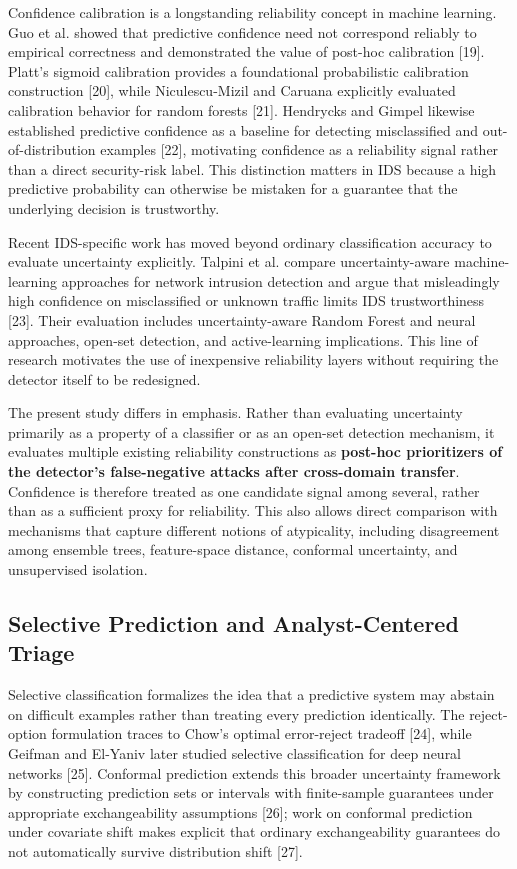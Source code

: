 \documentclass[conference]{IEEEtran}
\begin{document}
Confidence calibration is a longstanding reliability concept in machine learning. Guo et al. showed that predictive confidence need not correspond reliably to empirical correctness and demonstrated the value of post-hoc calibration [19]. Platt's sigmoid calibration provides a foundational probabilistic calibration construction [20], while Niculescu-Mizil and Caruana explicitly evaluated calibration behavior for random forests [21]. Hendrycks and Gimpel likewise established predictive confidence as a baseline for detecting misclassified and out-of-distribution examples [22], motivating confidence as a reliability signal rather than a direct security-risk label. This distinction matters in IDS because a high predictive probability can otherwise be mistaken for a guarantee that the underlying decision is trustworthy.

Recent IDS-specific work has moved beyond ordinary classification accuracy to evaluate uncertainty explicitly. Talpini et al. compare uncertainty-aware machine-learning approaches for network intrusion detection and argue that misleadingly high confidence on misclassified or unknown traffic limits IDS trustworthiness [23]. Their evaluation includes uncertainty-aware Random Forest and neural approaches, open-set detection, and active-learning implications. This line of research motivates the use of inexpensive reliability layers without requiring the detector itself to be redesigned.

The present study differs in emphasis. Rather than evaluating uncertainty primarily as a property of a classifier or as an open-set detection mechanism, it evaluates multiple existing reliability constructions as \textbf{post-hoc prioritizers of the detector's false-negative attacks after cross-domain transfer}. Confidence is therefore treated as one candidate signal among several, rather than as a sufficient proxy for reliability. This also allows direct comparison with mechanisms that capture different notions of atypicality, including disagreement among ensemble trees, feature-space distance, conformal uncertainty, and unsupervised isolation.

\subsection{Selective Prediction and Analyst-Centered Triage}

Selective classification formalizes the idea that a predictive system may abstain on difficult examples rather than treating every prediction identically. The reject-option formulation traces to Chow's optimal error-reject tradeoff [24], while Geifman and El-Yaniv later studied selective classification for deep neural networks [25]. Conformal prediction extends this broader uncertainty framework by constructing prediction sets or intervals with finite-sample guarantees under appropriate exchangeability assumptions [26]; work on conformal prediction under covariate shift makes explicit that ordinary exchangeability guarantees do not automatically survive distribution shift [27].
\end{document}
